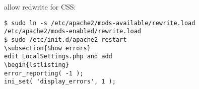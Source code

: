 \documentclass[12pt]{article}
\begin{document}
allow redwrite  for CSS:
\begin{lstlisting}
$ sudo ln -s /etc/apache2/mods-available/rewrite.load /etc/apache2/mods-enabled/rewrite.load
$ sudo /etc/init.d/apache2 restart
\subsection{Show errors}
edit LocalSettings.php and add
\begin{lstlisting}
error_reporting( -1 );
ini_set( 'display_errors', 1 );
\end{lstlisting}
\end{document}
